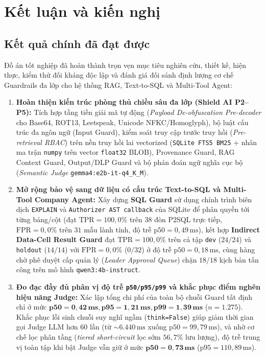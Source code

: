 \chapter*{Kết luận và kiến nghị}

\section*{Kết quả chính đã đạt được}

Đồ án tốt nghiệp đã hoàn thành trọn vẹn mục tiêu nghiên cứu, thiết kế, hiện thực, kiểm thử đối kháng độc lập và đánh giá đối sánh định lượng cơ chế Guardrails đa lớp cho hệ thống RAG, Text-to-SQL và Multi-Tool Agent:

\begin{enumerate}
    \item \textbf{Hoàn thiện kiến trúc phòng thủ chiều sâu đa lớp (Shield AI P2--P5):} Tích hợp tầng tiền giải mã tự động (\emph{Payload De-obfuscation Pre-decoder} cho Base64, ROT13, Leetspeak, Unicode NFKC/Homoglyph), bộ luật cấu trúc đa ngôn ngữ (Input Guard), kiểm soát truy cập trước truy hồi (\emph{Pre-retrieval RBAC}) trên nền truy hồi lai vectorized (\texttt{SQLite FTS5 BM25} + nhân ma trận \texttt{numpy} trên vector \texttt{float32} BLOB), Provenance Guard, RAG Context Guard, Output/DLP Guard và bộ phán đoán ngữ nghĩa cục bộ (\emph{Semantic Judge} \texttt{gemma4:e2b-\allowbreak it-\allowbreak q4\_\allowbreak K\_\allowbreak M}).
    \item \textbf{Mở rộng bảo vệ sang dữ liệu có cấu trúc Text-to-SQL và Multi-Tool Company Agent:} Xây dựng \textbf{SQL Guard} sử dụng chính trình biên dịch \texttt{EXPLAIN} và \texttt{Authorizer AST callback} của SQLite để phân quyền tới từng bảng/cột (đạt $\text{TPR} = 100{,}0\%$ trên $38$ đòn P2SQL trực tiếp, $\text{FPR} = 0{,}0\%$ trên $31$ mẫu lành tính, độ trễ $\text{p50} = 0{,}49\,\text{ms}$), kết hợp \textbf{Indirect Data-Cell Result Guard} đạt $\text{TPR} = 100{,}0\%$ trên cả tập \texttt{dev} ($24/24$) và \texttt{holdout} ($14/14$) với $\text{FPR} = 0{,}0\%$ ($0/32$) ở độ trễ $\text{p50} = 0{,}18\,\text{ms}$, cùng hàng chờ phê duyệt cấp quản lý (\emph{Leader Approval Queue}) chặn $18/18$ kịch bản tấn công trên mô hình \texttt{qwen3:4b-\allowbreak instruct}.
    \item \textbf{Đo đạc đầy đủ phân vị độ trễ \texttt{p50/\allowbreak p95/\allowbreak p99} và khắc phục điểm nghẽn hiệu năng Judge:} Xác lập tổng chi phí của toàn bộ chuỗi Guard tất định chỉ ở mức $\mathbf{\text{p50} = 0{,}42\,\text{ms}, \text{p95} = 1{,}21\,\text{ms}, \text{p99} = 1{,}39\,\text{ms}}$ ($n = 1.275$). Khắc phục lỗi sinh chuỗi suy nghĩ ngầm (\texttt{think=False}) giúp giảm thời gian gọi Judge LLM hơn 60 lần (từ $\sim 6.440\,\text{ms}$ xuống $\text{p50} = 99{,}79\,\text{ms}$), và nhờ cơ chế lọc phân tầng (\emph{tiered short-circuit} lọc sớm $56{,}7\%$ lưu lượng), độ trễ trung vị toàn tập khi bật Judge vẫn giữ ở mức $\mathbf{\text{p50} = 0{,}73\,\text{ms}}$ ($\text{p95} = 110{,}89\,\text{ms}$).

\end{enumerate}
